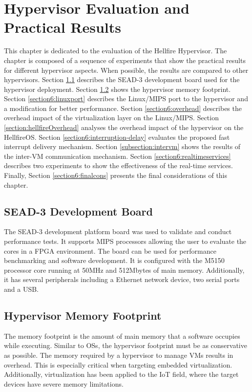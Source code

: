 \chapter{\label{chapter6:evaluation}Hypervisor Evaluation and Practical Results}

This chapter is dedicated to the evaluation of the Hellfire Hypervisor. The chapter is composed of a sequence of experiments that show the practical results for different hypervisor aspects. When possible, the results are compared to other hypervisors. Section \ref{section6:devboard} describes the SEAD-3 development board used for the hypervisor deployment. Section \ref{section6:footprint} shows the hypervisor memory footprint. Section \ref{section6:linuxport} describes the Linux/MIPS port to the hypervisor and a modification for better performance. Section \ref{section6:overhead} describes the overhead impact of the virtualization layer on the Linux/MIPS. Section \ref{section:hellfireOverhead} analyses the overhead impact of the hypervisor on the HellfireOS. Section \ref{section6:interruption-delay} evaluates the proposed fast interrupt delivery mechanism. Section \ref{subsection:intervm} shows the results of the inter-VM communication mechanism. Section \ref{section6:realtimeservices} describes two experiments to show the effectiveness of the real-time services. Finally, Section \ref{section6:finalcons} presents the final considerations of this chapter. 

\section{SEAD-3 Development Board}
\label{section6:devboard}

The SEAD-3 development platform board \cite{sead32010} was used to validate and conduct performance tests. It supports MIPS processors allowing the user to evaluate the cores in a FPGA environment. The board can be used for performance benchmarking and software development. It is configured with the M5150 processor core running at 50MHz and 512Mbytes of main memory. Additionally, it has several peripherals including a Ethernet network device, two serial ports and  a USB.


\section{Hypervisor Memory Footprint}
\label{section6:footprint}

The memory footprint is the amount of main memory that a software occupies while executing. Similar to OSs, the hypervisor footprint must be as conservative as possible. The memory required by a hypervisor to manage  VMs results in overhead. This is especially critical when targeting embedded virtualization. Additionally, virtualization has been applied to the IoT field, where the target devices have severe memory limitations.

